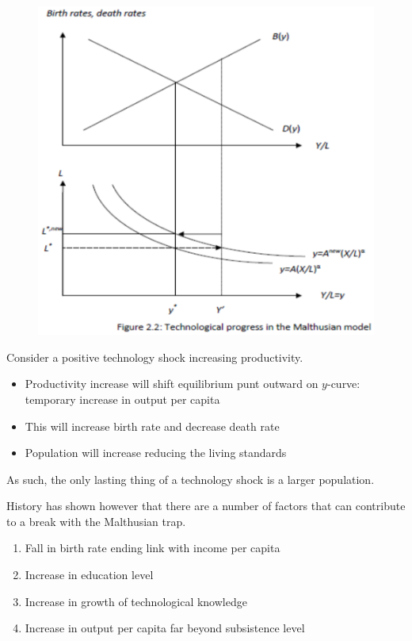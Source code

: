 \documentclass{beamer}
\begin{document}
\begin{frame}
  \begin{figure}
    \includegraphics[scale=.7]{tech_progress.eps}
  \end{figure}
\end{frame}

\begin{frame}
  Consider a positive technology shock increasing productivity. 
  \begin{itemize}
    \item Productivity increase will shift equilibrium punt outward on $y$-curve: temporary increase in output per capita
    \item This will increase birth rate and decrease death rate
    \item Population will increase reducing the living standards
  \end{itemize}
  \medskip
  As such, the only lasting thing of a technology shock is a larger population.
\end{frame}

\begin{frame}
History has shown however that there are a number of factors that can contribute to a break with the Malthusian trap. 
\begin{enumerate}
  \item Fall in birth rate ending link with income per capita
  \item Increase in education level
  \item Increase in growth of technological knowledge
  \item Increase in output per capita far beyond subsistence level
\end{enumerate}
\end{frame}
\end{document}

